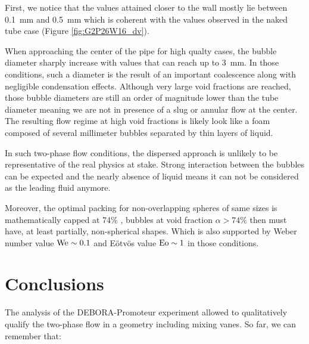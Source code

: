 \npar

First, we notice that the values attained closer to the wall mostly lie between 0.1\ mm and 0.5\ mm which is coherent with the values observed in the naked tube case (Figure \ref{fig:G2P26W16_dv}).

\npar

When approaching the center of the pipe for high qualty cases, the bubble diameter sharply increase with values that can reach up to 3\ mm. In those conditions, such a diameter is the result of an important coalescence along with negligible condensation effects. Although very large void fractions are reached, those bubble diameters are still an order of magnitude lower than the tube diameter meaning we are not in presence of a slug or annular flow at the center. The resulting flow regime at high void fractions is likely look like a foam composed of several millimeter bubbles separated by thin layers of liquid.

\begin{remark*}{}
In such two-phase flow conditions, the dispersed approach is unlikely to be representative of the real physics at stake. Strong interaction between the bubbles can be expected and the nearly absence of liquid means it can not be considered as the leading fluid anymore.

\npar

Moreover, the optimal packing for non-overlapping spheres of same sizes is mathematically capped at 74\% \cite{wu_bulk_2003}, bubbles at void fraction $\alpha > 74\%$ then must have, at least partially, non-spherical shapes. Which is also supported by Weber number value $\mathrm{We} \sim 0.1$ and E\"otv\"os value $\mathrm{Eo} \sim 1$ in those conditions.
\end{remark*}



\section{Conclusions}

The analysis of the DEBORA-Promoteur experiment allowed to qualitatively qualify the two-phase flow in a geometry including mixing vanes. So far, we can remember that:

